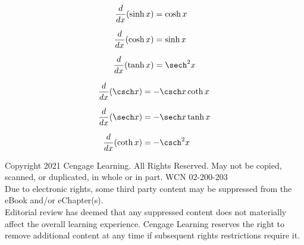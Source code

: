 \begin{minipage}[t]{0.70\textwidth}
    \vskip 7pt
    \begin{tcolorbox}[
        colback=white,
        colframe=stewartred,
        boxrule=1pt,
        arc=0mm,
        left=12pt,
        right=12pt,
        top=7pt,
        bottom=8pt
    ]
        \vskip 6pt
        \noindent
        \begin{minipage}[t]{0.48\textwidth}
            \begin{align*}
                \frac{d}{dx}(\sinh x) &= \cosh x \\[6pt]
                \frac{d}{dx}(\cosh x) &= \sinh x \\[6pt]
                \frac{d}{dx}(\tanh x) &= \sech^2 x
            \end{align*}
        \end{minipage}%
        \hfill
        \begin{minipage}[t]{0.48\textwidth}
            \begin{align*}
                \frac{d}{dx}(\csch x) &= -\csch x \coth x \\[6pt]
                \frac{d}{dx}(\sech x) &= -\sech x \tanh x \\[6pt]
                \frac{d}{dx}(\coth x) &= -\csch^2 x
            \end{align*}
        \end{minipage}
    \end{tcolorbox}
\end{minipage}

\vfill
\noindent
\begin{center}
    {\fontsize{6.5}{7.5}\selectfont\color{gray}
    Copyright 2021 Cengage Learning. All Rights Reserved. May not be copied, scanned, or duplicated, in whole or in part. WCN 02-200-203\\
    Due to electronic rights, some third party content may be suppressed from the eBook and/or eChapter(s).\\
    Editorial review has deemed that any suppressed content does not materially affect the overall learning experience. Cengage Learning reserves the right to remove additional content at any time if subsequent rights restrictions require it.}
\end{center}
